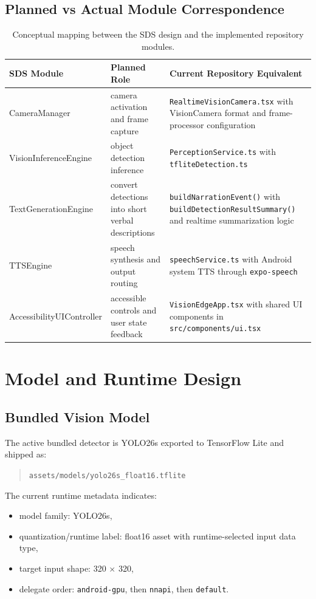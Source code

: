 \documentclass[conference]{IEEEtran}
\newcommand{\codepath}[1]{\begingroup\urlstyle{tt}\nolinkurl{#1}\endgroup}
\newcommand{\codeid}[1]{\begingroup\urlstyle{tt}\nolinkurl{#1}\endgroup}
\begin{document}
\subsection{Planned vs Actual Module Correspondence}
\begin{table}[t]
\centering
\small
\begin{tabularx}{\textwidth}{>{\raggedright\arraybackslash}p{} >{\raggedright\arraybackslash}p{} >{\raggedright\arraybackslash}X}
\toprule
SDS Module & Planned Role & Current Repository Equivalent \\
\midrule
CameraManager & camera activation and frame capture & \codeid{RealtimeVisionCamera.tsx} with VisionCamera format and frame-processor configuration \\
VisionInferenceEngine & object detection inference & \codeid{PerceptionService.ts} with \codeid{tfliteDetection.ts} \\
TextGenerationEngine & convert detections into short verbal descriptions & \codeid{buildNarrationEvent()} with \codeid{buildDetectionResultSummary()} and realtime summarization logic \\
TTSEngine & speech synthesis and output routing & \codeid{speechService.ts} with Android system TTS through \codeid{expo-speech} \\
AccessibilityUIController & accessible controls and user state feedback & \codeid{VisionEdgeApp.tsx} with shared UI components in \codepath{src/components/ui.tsx} \\
\bottomrule
\end{tabularx}
\caption{Conceptual mapping between the SDS design and the implemented repository modules.}
\label{tab:modulemapping}
\end{table}

\section{Model and Runtime Design}
\subsection{Bundled Vision Model}
The active bundled detector is YOLO26s exported to TensorFlow Lite and shipped as:
\begin{quote}
\codepath{assets/models/yolo26s_float16.tflite}
\end{quote}

The current runtime metadata indicates:
\begin{itemize}[leftmargin=1.2em]
\item model family: YOLO26s,
\item quantization/runtime label: float16 asset with runtime-selected input data type,
\item target input shape: 320 \(\times\) 320,
\item delegate order: \codeid{android-gpu}, then \codeid{nnapi}, then \codeid{default}.
\end{itemize}
\end{document}
